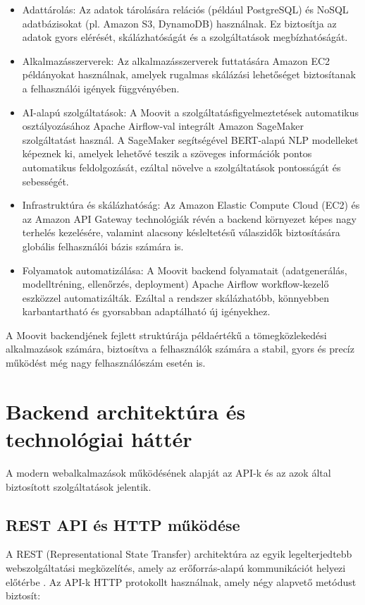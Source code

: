 \begin{itemize}
    \item Adattárolás: Az adatok tárolására relációs (például PostgreSQL) és NoSQL adatbázisokat (pl. Amazon S3, DynamoDB) használnak. Ez biztosítja az adatok gyors elérését, skálázhatóságát és a szolgáltatások megbízhatóságát.
    
    \item Alkalmazásszerverek: Az alkalmazásszerverek futtatására Amazon EC2 példányokat használnak, amelyek rugalmas skálázási lehetőséget biztosítanak a felhasználói igények függvényében.
    
    \item AI-alapú szolgáltatások: A Moovit a szolgáltatásfigyelmeztetések automatikus osztályozásához Apache Airflow-val integrált Amazon SageMaker szolgáltatást használ. A SageMaker segítségével BERT-alapú NLP modelleket képeznek ki, amelyek lehetővé teszik a szöveges információk pontos automatikus feldolgozását, ezáltal növelve a szolgáltatások pontosságát és sebességét.
    
    \item Infrastruktúra és skálázhatóság: Az Amazon Elastic Compute Cloud (EC2) és az Amazon API Gateway technológiák révén a backend környezet képes nagy terhelés kezelésére, valamint alacsony késleltetésű válaszidők biztosítására globális felhasználói bázis számára is.
    
    \item Folyamatok automatizálása: A Moovit backend folyamatait (adatgenerálás, modelltréning, ellenőrzés, deployment) Apache Airflow workflow-kezelő eszközzel automatizálták. Ezáltal a rendszer skálázhatóbb, könnyebben karbantartható és gyorsabban adaptálható új igényekhez.
\end{itemize}

A Moovit backendjének fejlett struktúrája példaértékű a tömegközlekedési alkalmazások számára, biztosítva a felhasználók számára a stabil, gyors és precíz működést még nagy felhasználószám esetén is.


\section{Backend architektúra és technológiai háttér}

A modern webalkalmazások működésének alapját az API-k és az azok által biztosított szolgáltatások jelentik.

\subsection{REST API és HTTP működése}
A REST (Representational State Transfer) architektúra az egyik legelterjedtebb webszolgáltatási megközelítés, amely az erőforrás-alapú kommunikációt helyezi előtérbe \cite{zhou2014rest}. Az API-k HTTP protokollt használnak, amely négy alapvető metódust biztosít:

